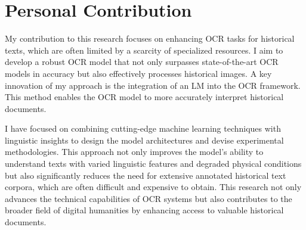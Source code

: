 \section{Personal Contribution}
\label{sec:1_personal_contribution}
My contribution to this research focuses on enhancing OCR tasks for historical texts, which are often limited by a scarcity of specialized resources. I aim to develop a robust OCR model that not only surpasses state-of-the-art OCR models in accuracy but also effectively processes historical images. A key innovation of my approach is the integration of an LM into the OCR framework. This method enables the OCR model to more accurately interpret historical documents.

I have focused on combining cutting-edge machine learning techniques with linguistic insights to design the model architectures and devise experimental methodologies. This approach not only improves the model's ability to understand texts with varied linguistic features and degraded physical conditions but also significantly reduces the need for extensive annotated historical text corpora, which are often difficult and expensive to obtain. This research not only advances the technical capabilities of OCR systems but also contributes to the broader field of digital humanities by enhancing access to valuable historical documents.

